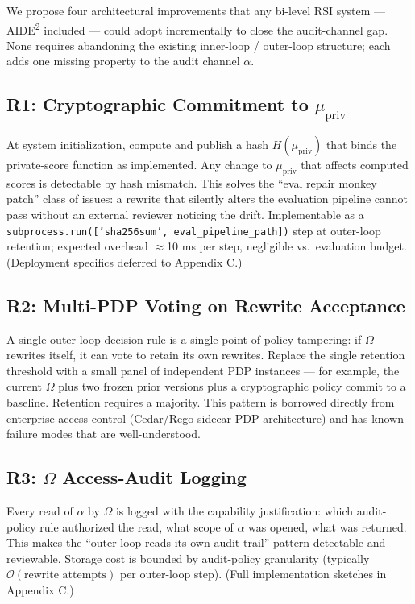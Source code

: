 
We propose four architectural improvements that any bi-level RSI system --- AIDE\textsuperscript{2} included --- could adopt incrementally to close the audit-channel gap. None requires abandoning the existing inner-loop / outer-loop structure; each adds one missing property to the audit channel $\alpha$.

\subsection{R1: Cryptographic Commitment to $\mu_{\text{priv}}$}

At system initialization, compute and publish a hash $H(\mu_{\text{priv}})$ that binds the private-score function as implemented. Any change to $\mu_{\text{priv}}$ that affects computed scores is detectable by hash mismatch. This solves the ``eval repair monkey patch'' class of issues: a rewrite that silently alters the evaluation pipeline cannot pass without an external reviewer noticing the drift. Implementable as a \texttt{subprocess.run(['sha256sum', eval\_pipeline\_path])} step at outer-loop retention; expected overhead $\approx$10 ms per step, negligible vs.\ evaluation budget. (Deployment specifics deferred to Appendix C.)

\subsection{R2: Multi-PDP Voting on Rewrite Acceptance}

A single outer-loop decision rule is a single point of policy tampering: if $\Omega$ rewrites itself, it can vote to retain its own rewrites. Replace the single retention threshold with a small panel of independent PDP instances --- for example, the current $\Omega$ plus two frozen prior versions plus a cryptographic policy commit to a baseline. Retention requires a majority. This pattern is borrowed directly from enterprise access control (Cedar/Rego sidecar-PDP architecture) and has known failure modes that are well-understood.

\subsection{R3: $\Omega$ Access-Audit Logging}

Every read of $\alpha$ by $\Omega$ is logged with the capability justification: which audit-policy rule authorized the read, what scope of $\alpha$ was opened, what was returned. This makes the ``outer loop reads its own audit trail'' pattern detectable and reviewable. Storage cost is bounded by audit-policy granularity (typically $\mathcal{O}(\text{rewrite attempts})$ per outer-loop step). (Full implementation sketches in Appendix C.)

